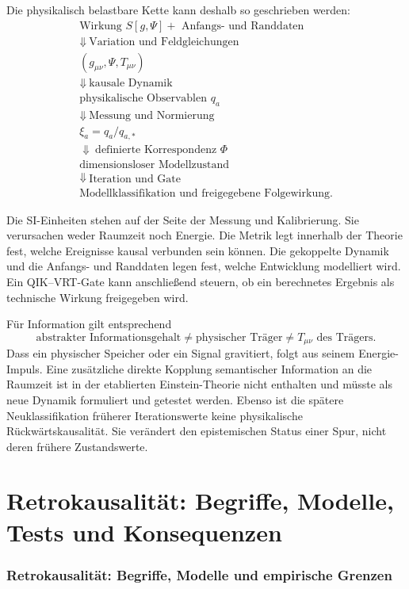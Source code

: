 \documentclass[11pt,a4paper]{article}
\theoremstyle{remark}
\begin{document}
Die physikalisch belastbare Kette kann deshalb so geschrieben werden:
\[
\boxed{
\begin{gathered}
\text{Wirkung }S[g,\Psi]+\text{ Anfangs- und Randdaten}
\\
\Downarrow\ \text{Variation und Feldgleichungen}
\\
(g_{\mu\nu},\Psi,T_{\mu\nu})
\\
\Downarrow\ \text{kausale Dynamik}
\\
\text{physikalische Observablen }q_a
\\
\Downarrow\ \text{Messung und Normierung}
\\
\xi_a=q_a/q_{a,*}
\\
\Downarrow\ \text{definierte Korrespondenz }\Phi
\\
\text{dimensionsloser Modellzustand}
\\
\Downarrow\ \text{Iteration und Gate}
\\
\text{Modellklassifikation und freigegebene Folgewirkung}.
\end{gathered}}
\]

Die SI-Einheiten stehen auf der Seite der Messung und Kalibrierung. Sie
verursachen weder Raumzeit noch Energie. Die Metrik legt innerhalb der Theorie
fest, welche Ereignisse kausal verbunden sein können. Die gekoppelte Dynamik
und die Anfangs- und Randdaten legen fest, welche Entwicklung modelliert
wird. Ein QIK--VRT-Gate kann anschließend steuern, ob ein berechnetes Ergebnis
als technische Wirkung freigegeben wird.

Für Information gilt entsprechend
\[
  \text{abstrakter Informationsgehalt}
  \neq\text{physischer Träger}
  \neq T_{\mu\nu}\text{ des Trägers}.
\]
Dass ein physischer Speicher oder ein Signal gravitiert, folgt aus seinem
Energie-Impuls. Eine zusätzliche direkte Kopplung semantischer Information an
die Raumzeit ist in der etablierten Einstein-Theorie nicht enthalten und
müsste als neue Dynamik formuliert und getestet werden. Ebenso ist die
spätere Neuklassifikation früherer Iterationswerte keine physikalische
Rückwärtskausalität. Sie verändert den epistemischen Status einer Spur, nicht
deren frühere Zustandswerte.

\clearpage
\part{Retrokausalität: Begriffe, Modelle, Tests und Konsequenzen}

\section{Retrokausalität: Begriffe, Modelle und empirische Grenzen}
\label{sec:retrokausalitaet}
\end{document}
